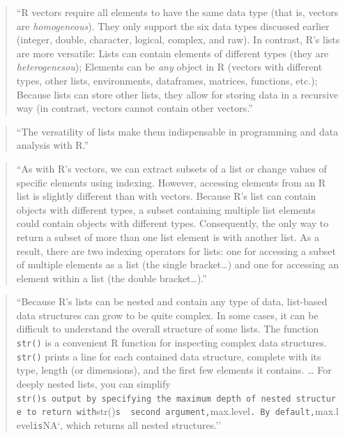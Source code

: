 \documentclass[]{tufte-book}
\begin{document}
\begin{quote}
``R vectors require all elements to have the same data type (that is, vectors are
\emph{homogeneous}). They only support the six data types discussed earlier (integer, double,
character, logical, complex, and raw). In contrast, R's lists are more versatile: Lists can
contain elements of different types (they are \emph{heterogenesou}); Elements can be \emph{any}
object in R (vectors with different types, other lists, environments, dataframes,
matrices, functions, etc.); Because lists can store other lists, they allow for storing
data in a recursive way (in contrast, vectors cannot contain other vectors.''
\citep{buffalo2015bioinformatics}
\end{quote}

\begin{quote}
``The versatility of lists make them indispensable in programming and data analysis with
R.'' \citep{buffalo2015bioinformatics}
\end{quote}

\begin{quote}
``As with R's vectors, we can extract subsets of a list or change values of
specific elements using indexing. However, accessing elements from an R list is
slightly different than with vectors. Because R's list can contain objects with
different types, a subset containing multiple list elements could contain objects with
different types. Consequently, the only way to return a subset of more than one
list element is with another list. As a result, there are two indexing operators for lists:
one for accessing a subset of multiple elements as a list (the single bracket\ldots) and
one for accessing an element within a list (the double bracket\ldots).''
\citep{buffalo2015bioinformatics}
\end{quote}

\begin{quote}
``Because R's lists can be nested and contain any type of data, list-based data
structures can grow to be quite complex. In some cases, it can be difficult to
understand the overall structure of some lists. The function \texttt{str()} is a convenient
R function for inspecting complex data structures. \texttt{str()} prints a line for each
contained data structure, complete with its type, length (or dimensions), and the
first few elements it contains. \ldots{} For deeply nested lists, you can simplify \texttt{str()\textquotesingle{}\textquotesingle{}s\ output\ by\ specifying\ the\ maximum\ depth\ of\ nested\ structure\ to\ return\ with}str()\texttt{\textquotesingle{}s\ \ second\ argument,}max.level\texttt{.\ By\ default,}max.level\texttt{is}NA`, which returns all
nested structures.'' \citep{buffalo2015bioinformatics}
\end{quote}
\end{document}
